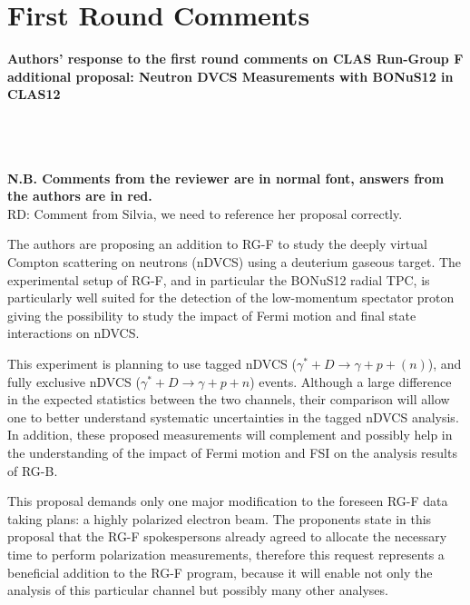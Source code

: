 \chapter{First Round Comments}

{\bf Authors' response to the first round comments on CLAS Run-Group F 
additional proposal: Neutron DVCS Measurements with BONuS12 in CLAS12}\\

{}

\def \rarr {\ensuremath{\rightarrow}}
~\\
~\\
~\\

{\bf N.B. Comments from the reviewer are in normal font, answers from the authors are in red.} \\

{\color{red} RD: Comment from Silvia, we need to reference her proposal correctly.}

The authors are proposing an addition to RG-F to study the deeply virtual 
Compton scattering on neutrons (nDVCS) using a deuterium gaseous target. The 
experimental setup of RG-F, and in particular the BONuS12 radial TPC, is 
particularly well suited for the detection of the low-momentum spectator proton 
giving the possibility to study the impact of Fermi motion and final state 
interactions on nDVCS.
 
 This experiment is planning to use tagged nDVCS ($\gamma^{*} + D \rarr \gamma 
 + p + (n)$), and fully exclusive nDVCS ($\gamma^{*} + D \rarr \gamma + p + n$) 
 events. Although a large difference in the expected statistics between the two 
 channels, their comparison will allow one to better understand systematic 
 uncertainties in the tagged nDVCS analysis. In addition, these proposed 
 measurements will complement and possibly help in the understanding of the 
 impact of Fermi motion and FSI on the analysis results of RG-B.
 
 This proposal demands only one major modification to the foreseen RG-F data 
 taking plans: a highly polarized electron beam. The proponents state in this 
 proposal that the RG-F spokespersons already agreed to allocate the necessary 
 time to perform polarization measurements, therefore this request represents a 
 beneficial addition to the RG-F program, because it will enable not only the 
 analysis of this particular channel but possibly many other analyses.
  
